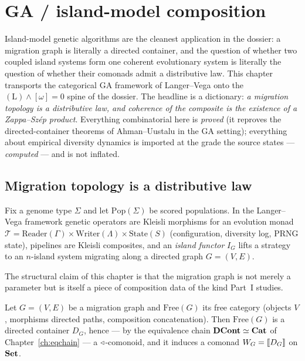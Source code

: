 \chapter{GA / island-model composition}
\label{ch:ga}

Island-model genetic algorithms are the cleanest application in the dossier: a
migration graph is literally a directed container, and the question of whether
two coupled island systems form one coherent evolutionary system is literally
the question of whether their comonads admit a distributive law. This chapter
transports the categorical GA framework of Langer--Vega \cite{langer-va-ga}
onto the $(\mathrm{L})\wedge[\omega]=0$ spine of the dossier. The headline is a
dictionary: \emph{a migration topology is a distributive law, and coherence of
the composite is the existence of a Zappa--Sz\'ep product}. Everything
combinatorial here is \emph{proved} (it reproves the directed-container
theorems of Ahman--Uustalu in the GA setting); everything about empirical
diversity dynamics is imported at the grade the source states --- \emph{computed}
--- and is not inflated.

\section{Migration topology is a distributive law}
\label{sec:ga-headline}

Fix a genome type $\Sigma$ and let $\mathrm{Pop}(\Sigma)$ be scored
populations. In the Langer--Vega framework \cite{langer-va-ga} genetic
operators are Kleisli morphisms for an evolution monad
$\mathcal T=\mathrm{Reader}(\Gamma)\times\mathrm{Writer}(\Lambda)\times
\mathrm{State}(S)$ (configuration, diversity log, PRNG state), pipelines are
Kleisli composites, and an \emph{island functor} $I_G$ lifts a strategy to an
$n$-island system migrating along a directed graph $G=(V,E)$.

The structural claim of this chapter is that the migration graph is not merely a
parameter but is itself a piece of composition data of the kind Part~I studies.

\begin{proposition}[Migration topology $=$ directed container; \emph{proved}]
\label{prop:ga-topology-dcont}
Let $G=(V,E)$ be a migration graph and $\mathrm{Free}(G)$ its free category
(objects $V$, morphisms directed paths, composition concatenation). Then
$\mathrm{Free}(G)$ is a
directed container $D_G$, hence --- by the equivalence chain
$\mathbf{DCont}\simeq\mathbf{Cat}$ of Chapter~\ref{ch:eqchain} --- a $\triangleleft$-comonoid, and it
induces a comonad $W_G=\llbracket D_G \rrbracket$ on $\mathbf{Set}$.
\end{proposition}

